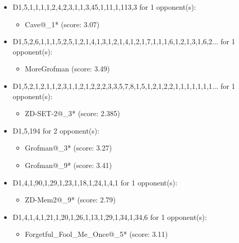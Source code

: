 \begin{appendices}
\begin{itemize}
    \item D1,5,1,1,1,1,2,4,2,3,1,1,3,45,1,11,1,113,3 for 1 opponent(s):
    \begin{multicols}{3}
         \begin{itemize}
            \item Cave@\_1* (score: 3.07)
        \end{itemize}
     \end{multicols}
     
    \item D1,5,2,6,1,1,1,5,2,5,1,2,1,4,1,3,1,2,1,4,1,2,1,7,1,1,1,6,1,2,1,3,1,6,2... for 1 opponent(s):
    \begin{multicols}{3}
         \begin{itemize}
            \item MoreGrofman (score: 3.49)
        \end{itemize}
     \end{multicols}
     
    \item D1,5,2,1,2,1,1,2,3,1,1,2,1,2,2,2,3,3,5,7,8,1,5,1,2,1,2,2,1,1,1,1,1,1,1... for 1 opponent(s):
    \begin{multicols}{3}
         \begin{itemize}
            \item ZD-SET-2@\_3* (score: 2.385)
        \end{itemize}
     \end{multicols}
     
    \item D1,5,194 for 2 opponent(s):
    \begin{multicols}{3}
         \begin{itemize}
            \item Grofman@\_3* (score: 3.27)
            \item Grofman@\_9* (score: 3.41)
        \end{itemize}
     \end{multicols}
     
    \item D1,4,1,90,1,29,1,23,1,18,1,24,1,4,1 for 1 opponent(s):
    \begin{multicols}{3}
         \begin{itemize}
            \item ZD-Mem2@\_9* (score: 2.79)
        \end{itemize}
     \end{multicols}
     
    \item D1,4,1,4,1,21,1,20,1,26,1,13,1,29,1,34,1,34,6 for 1 opponent(s):
    \begin{multicols}{3}
         \begin{itemize}
            \item Forgetful\_Fool\_Me\_Once@\_5* (score: 3.11)
        \end{itemize}
     \end{multicols}
     

\end{itemize}
\end{appendices}
